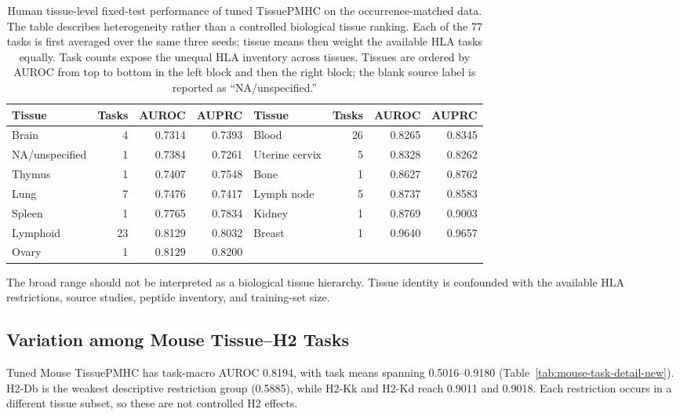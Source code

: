 \begin{table}[t]
\centering
\caption{Human tissue-level fixed-test performance of tuned TissuePMHC on the occurrence-matched data. The table describes heterogeneity rather than a controlled biological tissue ranking. Each of the 77 tasks is first averaged over the same three seeds; tissue means then weight the available HLA tasks equally. Task counts expose the unequal HLA inventory across tissues. Tissues are ordered by AUROC from top to bottom in the left block and then the right block; the blank source label is reported as ``NA/unspecified.''}
\label{tab:human-tissue-extremes}
\footnotesize
\begin{tabularx}{\textwidth}{>{\raggedright\arraybackslash}Xrrr>{\raggedright\arraybackslash}Xrrr}
\toprule
Tissue & Tasks & AUROC & AUPRC & Tissue & Tasks & AUROC & AUPRC \\
\midrule
Brain & 4 & 0.7314 & 0.7393 & Blood & 26 & 0.8265 & 0.8345 \\
NA/unspecified & 1 & 0.7384 & 0.7261 & Uterine cervix & 5 & 0.8328 & 0.8262 \\
Thymus & 1 & 0.7407 & 0.7548 & Bone & 1 & 0.8627 & 0.8762 \\
Lung & 7 & 0.7476 & 0.7417 & Lymph node & 5 & 0.8737 & 0.8583 \\
Spleen & 1 & 0.7765 & 0.7834 & Kidney & 1 & 0.8769 & 0.9003 \\
Lymphoid & 23 & 0.8129 & 0.8032 & Breast & 1 & 0.9640 & 0.9657 \\
Ovary & 1 & 0.8129 & 0.8200 & & & & \\
\bottomrule
\end{tabularx}
\end{table}

The broad range should not be interpreted as a biological tissue hierarchy. Tissue identity is confounded with the available HLA restrictions, source studies, peptide inventory, and training-set size.

\subsection{Variation among Mouse Tissue--H2 Tasks}

Tuned Mouse TissuePMHC has task-macro AUROC 0.8194, with task means spanning 0.5016--0.9180 (Table~\ref{tab:mouse-task-detail-new}). H2-Db is the weakest descriptive restriction group (0.5885), while H2-Kk and H2-Kd reach 0.9011 and 0.9018. Each restriction occurs in a different tissue subset, so these are not controlled H2 effects.

